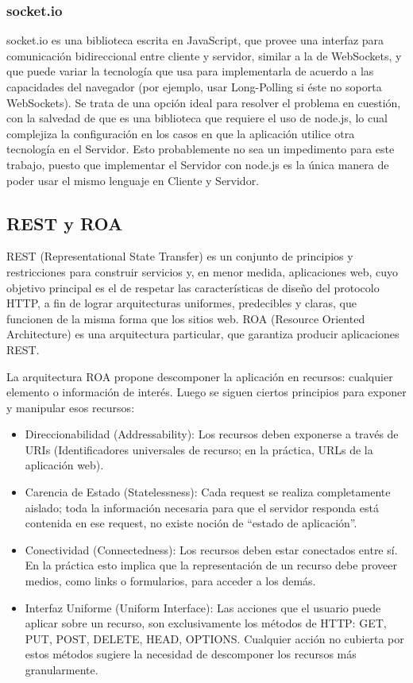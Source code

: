 \documentclass[doc,helv,longtable]{article}
\begin{document}
\subsubsection{socket.io}
socket.io\cite{socketio} es una biblioteca escrita en JavaScript, que provee una interfaz para comunicación bidireccional entre cliente y servidor, similar a la de WebSockets, y que puede variar la tecnología que usa para implementarla de acuerdo a las capacidades del navegador (por ejemplo, usar Long-Polling si éste no soporta WebSockets). Se trata de una opción ideal para resolver el problema en cuestión, con la salvedad de que es una biblioteca que requiere el uso de node.js, lo cual complejiza la configuración en los casos en que la aplicación utilice otra tecnología en el Servidor. Esto probablemente no sea un impedimento para este trabajo, puesto que implementar el Servidor con node.js es la única manera de poder usar el mismo lenguaje en Cliente y Servidor.

\subsection{REST y ROA}
REST (Representational State Transfer) es un conjunto de principios y restricciones para construir servicios y, en menor medida, aplicaciones web, cuyo objetivo principal es el de respetar las características de diseño del protocolo HTTP, a fin de lograr arquitecturas uniformes, predecibles y claras, que funcionen de la misma forma que los sitios web. ROA (Resource Oriented Architecture) es una arquitectura particular, que garantiza producir aplicaciones REST\cite{rest}.

La arquitectura ROA propone descomponer la aplicación en recursos: cualquier elemento o información de interés. Luego se siguen ciertos principios para exponer y manipular esos recursos:
\begin{itemize}
\item  Direccionabilidad (Addressability): Los recursos deben exponerse a través de URIs (Identificadores universales de recurso; en la práctica, URLs de la aplicación web).
\item  Carencia de Estado (Statelessness): Cada request se realiza completamente aislado; toda la información necesaria para que el servidor responda está contenida en ese request, no existe noción de “estado de aplicación”.
\item  Conectividad (Connectedness): Los recursos deben estar conectados entre sí. En la práctica esto implica que la representación de un recurso debe proveer medios, como links o formularios, para acceder a los demás.
\item  Interfaz Uniforme (Uniform Interface): Las acciones que el usuario puede aplicar sobre un recurso, son exclusivamente los métodos de HTTP: GET, PUT, POST, DELETE, HEAD, OPTIONS. Cualquier acción no cubierta por estos métodos sugiere la necesidad de descomponer los recursos más granularmente.

\end{itemize}
\end{document}
